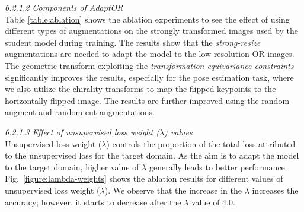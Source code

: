\emph{6.2.1.2 Components of AdaptOR}\\
Table \ref{table:ablation} shows the ablation experiments to see the effect of using different types of augmentations on the strongly transformed images used by the student model during training. The results show that the \emph{strong-resize} augmentations are needed to adapt the model to the low-resolution OR images. The geometric transform exploiting the \emph{transformation equivariance constraints} significantly improves the results, especially for the pose estimation task, where we also utilize the chirality transforms to map the flipped keypoints to the horizontally flipped image. The results are further improved using the random-augment and random-cut augmentations.

{\blue \emph{6.2.1.3 Effect of unsupervised loss weight ($\lambda$) values}\\
Unsupervised loss weight ($\lambda$) controls the proportion of the total loss attributed to the unsupervised loss for the target domain. As the aim is to adapt the model to the target domain, higher value of $\lambda$ generally leads to better performance. Fig.~\ref{figure:lambda-weights} shows the ablation results for different values of unsupervised loss weight ($\lambda$). We observe that the increase in the $\lambda$ increases the accuracy; however, it starts to decrease after the $\lambda$ value of 4.0.}

